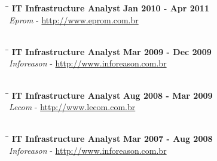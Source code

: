 \documentclass[margin]{res}
\begin{document}
\begin{resume}
\vspace{-0.1in}
\begin{tabbing}
  \hspace{2.3in}\= \hspace{1.7in}\= \kill %
  \textbf{IT Infrastructure Analyst}    \>\>\textbf{Jan 2010 - Apr 2011}\\
  \textit{Eprom} - \url{http://www.eprom.com.br}\\\\
\end{tabbing}\vspace{-20pt}      %


\vspace{-0.1in}
\begin{tabbing}
  \hspace{2.3in}\= \hspace{1.7in}\= \kill %
  \textbf{IT Infrastructure Analyst}    \>\>\textbf{Mar 2009 - Dec 2009}\\
  \textit{Inforeason} - \url{http://www.inforeason.com.br}\\\\
\end{tabbing}\vspace{-20pt}      %


\vspace{-0.1in}
\begin{tabbing}
  \hspace{2.3in}\= \hspace{1.7in}\= \kill %
  \textbf{IT Infrastructure Analyst}    \>\>\textbf{Aug 2008 - Mar 2009}\\
  \textit{Lecom} - \url{http://www.lecom.com.br}\\\\
\end{tabbing}\vspace{-20pt}      %

\vspace{-0.1in}
\begin{tabbing}
  \hspace{2.3in}\= \hspace{1.7in}\= \kill %
  \textbf{IT Infrastructure Analyst}    \>\>\textbf{Mar 2007 - Aug 2008}\\
  \textit{Inforeason} - \url{http://www.inforeason.com.br}\\\\
\end{tabbing}\vspace{-20pt}      %


\end{resume}
\end{document}
